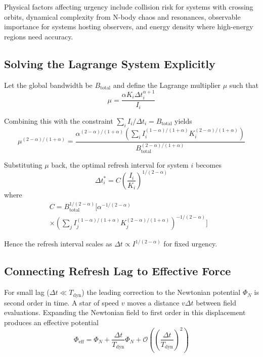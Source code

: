 \documentclass[usenatbib]{mnras}
\begin{document}
Physical factors affecting urgency include collision risk for systems with crossing orbits, dynamical complexity from N-body chaos and resonances, observable importance for systems hosting observers, and energy density where high-energy regions need accuracy.

\subsection{Solving the Lagrange System Explicitly}

Let the global bandwidth be $B_{\text{total}}$ and define the Lagrange multiplier $\mu$ such that
\begin{equation}
\mu = \frac{\alpha K_i \Delta t_i^{\alpha+1}}{I_i}
\end{equation}

Combining this with the constraint $\sum_i I_i / \Delta t_i = B_{\text{total}}$ yields
\begin{equation}
\mu^{(2-\alpha)/(1+\alpha)} = \frac{\alpha^{(2-\alpha)/(1+\alpha)} \left( \sum_i I_i^{(1-\alpha)/(1+\alpha)} K_i^{(2-\alpha)/(1+\alpha)} \right)}{B_{\text{total}}^{(2-\alpha)/(1+\alpha)}}
\end{equation}

Substituting $\mu$ back, the optimal refresh interval for system $i$ becomes
\begin{equation}
\Delta t_i^* = C \left( \frac{I_i}{K_i} \right)^{1/(2-\alpha)}
\end{equation}
where 
\begin{equation}
\begin{split}
C = B_{\text{total}}^{1/(2-\alpha)} \Bigg[ \alpha^{-1/(2-\alpha)} & \\
\times \left(\sum_j I_j^{(1-\alpha)/(1+\alpha)} K_j^{(2-\alpha)/(1+\alpha)} \right)^{-1/(2-\alpha)} \Bigg]
\end{split}
\end{equation}

Hence the refresh interval scales as $\Delta t \propto I^{1/(2-\alpha)}$ for fixed urgency.

\subsection{Connecting Refresh Lag to Effective Force}

For small lag ($\Delta t \ll T_{\text{dyn}}$) the leading correction to the Newtonian potential $\Phi_N$ is second order in time. A star of speed $v$ moves a distance $v\Delta t$ between field evaluations. Expanding the Newtonian field to first order in this displacement produces an effective potential
\begin{equation}
\Phi_{\text{eff}} = \Phi_N + \frac{\Delta t}{T_{\text{dyn}}} \Phi_N + \mathcal{O}\left(\left(\frac{\Delta t}{T_{\text{dyn}}}\right)^2\right)
\end{equation}
\end{document}
